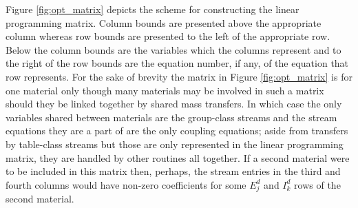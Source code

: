 Figure \ref{fig:opt_matrix}
depicts the scheme for constructing the linear programming matrix. Column bounds
are presented above the appropriate column whereas row bounds are presented to 
the
left of the appropriate row. Below the column bounds are the variables which
the columns represent and to the right of the row bounds are the equation
number, if any, of the equation that row represents. For the sake of brevity
the matrix in Figure \ref{fig:opt_matrix} is for one material only though many
materials may be involved in such a matrix should they be linked together
by shared mass transfers. In which case the only variables shared between materials are the
group-class streams and the stream equations they are a part of are the only
coupling equations; aside from transfers by table-class streams but those
are only represented in the linear programming matrix, they are handled by
other routines all together. If a second material were to be included in this
matrix then, perhaps, the stream entries in the third and fourth columns would
have non-zero coefficients for some $E_{j}^{d}$ and $I_{k}^{d}$ rows of the 
second material.


